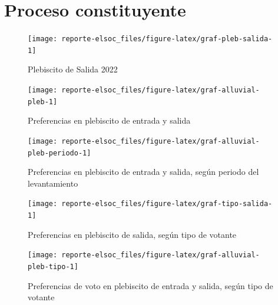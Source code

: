 \documentclass[
  12pt,
]{book}
\begin{document}
\hypertarget{proceso-constituyente}{%
\section{Proceso constituyente}\label{proceso-constituyente}}

\begin{figure}

{\centering \texttt{[image: reporte-elsoc\_files/figure-latex/graf-pleb-salida-1]} 

}

\caption{Plebiscito de Salida 2022}\label{fig:graf-pleb-salida}
\end{figure}

\begin{figure}

{\centering \texttt{[image: reporte-elsoc\_files/figure-latex/graf-alluvial-pleb-1]} 

}

\caption{Preferencias en plebiscito de entrada y salida}\label{fig:graf-alluvial-pleb}
\end{figure}

\begin{figure}

{\centering \texttt{[image: reporte-elsoc\_files/figure-latex/graf-alluvial-pleb-periodo-1]} 

}

\caption{Preferencias en plebiscito de entrada y salida, según periodo del levantamiento}\label{fig:graf-alluvial-pleb-periodo}
\end{figure}

\begin{figure}

{\centering \texttt{[image: reporte-elsoc\_files/figure-latex/graf-tipo-salida-1]} 

}

\caption{Preferencias en plebiscito de salida, según tipo de votante}\label{fig:graf-tipo-salida}
\end{figure}

\begin{figure}

{\centering \texttt{[image: reporte-elsoc\_files/figure-latex/graf-alluvial-pleb-tipo-1]} 

}

\caption{Preferencias de voto en plebiscito de entrada y salida, según tipo de votante}\label{fig:graf-alluvial-pleb-tipo}
\end{figure}
\end{document}
